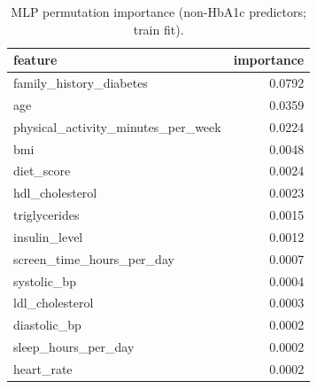 \begin{table}[H]
\begin{center}
\begin{tabular}{lr}
\toprule
feature & importance \\
\midrule
family\_history\_diabetes & 0.0792 \\
age & 0.0359 \\
physical\_activity\_minutes\_per\_week & 0.0224 \\
bmi & 0.0048 \\
diet\_score & 0.0024 \\
hdl\_cholesterol & 0.0023 \\
triglycerides & 0.0015 \\
insulin\_level & 0.0012 \\
screen\_time\_hours\_per\_day & 0.0007 \\
systolic\_bp & 0.0004 \\
ldl\_cholesterol & 0.0003 \\
diastolic\_bp & 0.0002 \\
sleep\_hours\_per\_day & 0.0002 \\
heart\_rate & 0.0002 \\
\bottomrule
\end{tabular}
\end{center}
\vspace{-5pt}
\caption{MLP permutation importance (non-HbA1c predictors; train fit).}
\label{tab:mlp_perm_importance_non_hba1c}
\end{table}
